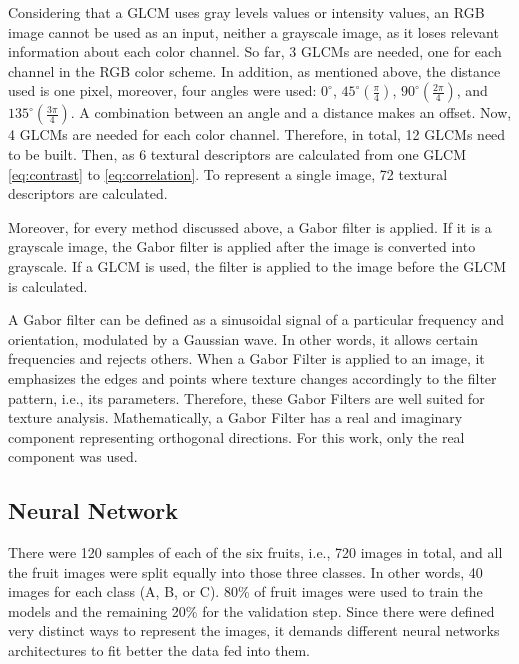 \documentclass[../main.tex]{subfile}
\begin{document}
    Considering that a GLCM uses gray levels values or intensity values, an RGB image cannot be used as an input, neither a grayscale image, as it loses relevant information about each color channel. So far, 3 GLCMs are needed, one for each channel in the RGB color scheme. In addition, as mentioned above, the distance used is one pixel, moreover, four angles were used: $0^{\circ}$, $45^{\circ} (\frac{\pi}{4})$, $90^{\circ} (\frac{2\pi}{4})$, and $135^{\circ} (\frac{3\pi}{4})$. A combination between an angle and a distance makes an offset. Now, 4 GLCMs are needed for each color channel. Therefore, in total, 12 GLCMs need to be built. Then, as 6 textural descriptors are calculated from one GLCM \eqref{eq:contrast} to \eqref{eq:correlation}. To represent a single image, 72 textural descriptors are calculated.
    
    Moreover, for every method discussed above, a Gabor filter is applied. If it is a grayscale image, the Gabor filter is applied after the image is converted into grayscale. If a GLCM is used, the filter is applied to the image before the GLCM is calculated.

    A Gabor filter can be defined as a sinusoidal signal of a particular frequency and orientation, modulated by a Gaussian wave. In other words, it allows certain frequencies and rejects others. When a Gabor Filter is applied to an image, it emphasizes the edges and points where texture changes accordingly to the filter pattern, i.e., its parameters. Therefore, these Gabor Filters are well suited for texture analysis. Mathematically, a Gabor Filter has a real and imaginary component representing orthogonal directions. For this work, only the real component was used.
    
    \subsection{Neural Network} \label{subsec:neural-network}
    
    There were 120 samples of each of the six fruits, i.e., 720 images in total, and all the fruit images were split equally into those three classes. In other words, 40 images for each class (A, B, or C). 80\% of fruit images were used to train the models and the remaining 20\% for the validation step. Since there were defined very distinct ways to represent the images, it demands different neural networks architectures to fit better the data fed into them.
    
    
    
\end{document}
